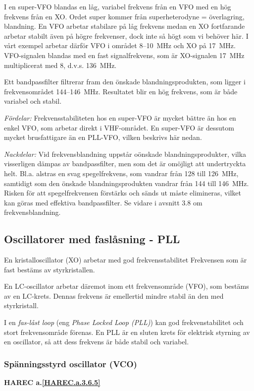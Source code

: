I en super-VFO blandas en låg, variabel frekvens från en VFO med en
hög frekvens från en XO. Ordet super kommer från superheterodyne =
överlagring, blandning. En VFO arbetar stabilare på låg frekvens
medan en XO fortfarande arbetar stabilt även på högre frekvenser, dock
inte så högt som vi behöver här. I vårt exempel arbetar därför VFO i
området 8--10~MHz och XO på 17~MHz. VFO-signalen blandas med en fast
signalfrekvens, som är XO-signalen 17~MHz multiplicerat med 8,
d.v.s. 136~MHz.

Ett bandpassfilter filtrerar fram den önskade blandningsprodukten, som
ligger i frekvensområdet 144--146~MHz. Resultatet blir en hög frekvens,
som är både variabel och stabil.

\emph{Fördelar:} Frekvensstabiliteten hos en super-VFO är mycket
bättre än hos en enkel VFO, som arbetar direkt i VHF-området. En
super-VFO är dessutom mycket brusfattigare än en PLL-VFO, vilken
beskrivs här nedan.

\emph{Nackdelar:} Vid frekvensblandning uppstår oönskade
blandningsprodukter, vilka visserligen dämpas av bandpassfilter, men
som det är omöjligt att undertryckta helt. Bl.a. alstras en svag
spegelfrekvens, som vandrar från 128 till 126~MHz, samtidigt som den
önskade blandningsprodukten vandrar från 144 till 146~MHz. Risken
för att spegelfrekvensen förstärks och sänds ut måste elimineras,
vilket kan göras med effektiva bandpassfilter. Se vidare i avsnitt 3.8
om frekvensblandning.

\subsection{Oscillatorer med faslåsning - PLL}

En kristalloscillator (XO) arbetar med god frekvensstabilitet
Frekvensen som är fast bestäms av styrkristallen.

En LC-oscillator arbetar däremot inom ett frekvensområde (VFO), som
bestäms av en LC-krets. Dennas frekvens är emellertid mindre stabil än
den med styrkristall.

I en \emph{fas-låst loop} (eng \emph{Phase Locked Loop (PLL)}) kan god
frekvenstabilitet och stort frekvensområde förenas. En PLL är en sluten krets
för elektrisk styrning av en oscillator, så att dess frekvens är både stabil och
variabel.

\subsubsection{Spänningsstyrd oscillator (VCO)}
\textbf{HAREC a.\ref{HAREC.a.3.6.5}\label{myHAREC.a.3.6.5}}

